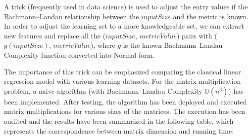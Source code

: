 A trick (frequently used in data science) is used to adjust the entry values if the Bachmann–Landau relationship between the $inputSize$ and the metric is known. In order to adjust the learning set to a more knowledgeable set, we can extract new features and replace all the ($inputSize$, $metricValue$) pairs with ($g(inputSize)$, $metricValue$), where $g$ is the known Bachmann–Landau Complexity function converted into Normal form.


The importance of this trick can be emphasized comparing the classical linear regression model with various learning datasets. For the matrix multiplication problem, a naive algorithm (with Bachmann–Landau Complexity $\mathbb{O}(n^{3})$) has been implemented. After testing, the algorithm has been deployed and executed matrix multiplications for various sizes of the matrices. The execution has been audited and the results have been summarized in the following table, which represents the correspondence between matrix dimension and running time:

